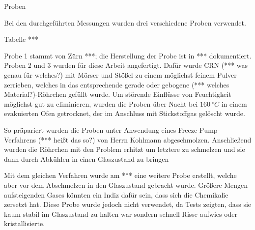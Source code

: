 Proben 

Bei den durchgeführten Messungen wurden drei verschiedene Proben verwendet.


Tabelle ***


Probe 1 stammt von Zürn ***; die Herstellung der Probe ist in *** dokumentiert. Proben 2 und 3 wurden für diese Arbeit angefertigt.
Dafür wurde CRN (*** was genau für welches?) mit Mörser und Stößel zu einem möglichst feinem Pulver zerrieben, welches in das entsprechende gerade oder gebogene (*** welches Material?)-Röhrchen gefüllt wurde. Um störende Einflüsse von Feuchtigkeit möglichst gut zu eliminieren, wurden die Proben über Nacht bei $\SI{160}{^\circ C}$ in einem evakuierten Ofen getrocknet, der im Anschluss mit Stickstoffgas gelöscht wurde.

So präpariert wurden die Proben unter Anwendung eines Freeze-Pump-Verfahrens (*** heißt das so?) von Herrn Kohlmann abgeschmolzen. Anschließend wurden die Röhrchen mit den Problem erhitzt um letztere zu schmelzen und sie dann durch Abkühlen in einen Glaszustand zu bringen

Mit dem gleichen Verfahren wurde am *** eine weitere Probe erstellt, welche aber vor dem Abschmelzen in den Glaszustand gebracht wurde. Größere Mengen aufsteigenden Gases könnten ein Indiz dafür sein, dass sich die Chemikalie zersetzt hat. Diese Probe wurde jedoch nicht verwendet, da Tests zeigten, dass sie kaum stabil im Glaszustand zu halten war sondern schnell Risse aufwies oder kristallisierte.
